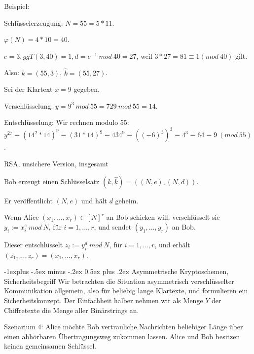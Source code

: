 \documentclass[a4paper]{article}
\makeatletter
\renewcommand{\subsection}{\@startsection{subsection}{2}{0mm}%
 {-1explus -.5ex minus -.2ex}%
 {0.5ex plus .2ex}%
 {\normalfont\normalsize\bfseries}}
\makeatother
\begin{document}
\begin{multicols}{3}
        Beispiel:
        \begin{itemize*}
            \item Schlüsselerzeugung: $N= 55 = 5*11$.
            \item  $\varphi(N) = 4*10 = 40$.
            \item  $e= 3, ggT(3,40) = 1, d=e^{-1}\ mod\ 40 = 27$, weil $3*27 = 81\equiv 1 (mod\ 40)$ gilt.
            \item  Also: $k= (55,3)$, $\hat{k}= (55,27)$.
            \item  Sei der Klartext $x=9$ gegeben.
            \item  Verschlüsselung: $y= 9^3\ mod\ 55 = 729\ mod\ 55 = 14$.
            \item  Entschlüsselung: Wir rechnen modulo 55: $y^{27}\equiv (14^2 * 14)^9 \equiv (31*14)^9 \equiv 434^9 \equiv ((-6)^3)^3 \equiv 4^3 \equiv 64 \equiv 9\ (mod\ 55)$.
        \end{itemize*}

        RSA, unsichere Version, insgesamt
        \begin{itemize*}
            \item Bob erzeugt einen Schlüsselsatz $(k, \hat{k}) = ((N,e),(N,d))$.
            \item  Er veröffentlicht $(N,e)$ und hält $d$ geheim.
            \item  Wenn Alice $(x_1,...,x_r)\in [N]^r$ an Bob schicken will, verschlüsselt sie $y_i:=x^e_i\ mod\ N$, für $i=1,...,r$, und sendet $(y_1,...,y_r)$ an Bob.
            \item  Dieser entschlüsselt $z_i:=y^d_i\ mod\ N$, für $i=1,...,r$, und erhält $(z_1,...,z_r) = (x_1,...,x_r)$.
        \end{itemize*}

        \subsection{Asymmetrische Kryptoschemen, Sicherheitsbegriff}
        Wir betrachten die Situation asymmetrisch verschlüsselter Kommunikation allgemein, also für beliebig lange Klartexte, und formulieren ein Sicherheitskonzept. Der Einfachheit halber nehmen wir als Menge $Y$ der Chiffretexte die Menge aller Binärstrings an.

        Szenarium 4: Alice möchte Bob vertrauliche Nachrichten beliebiger Länge über einen abhörbaren Übertragungsweg zukommen lassen. Alice und Bob besitzen keinen gemeinsamen Schlüssel.


\end{multicols}
\end{document}
